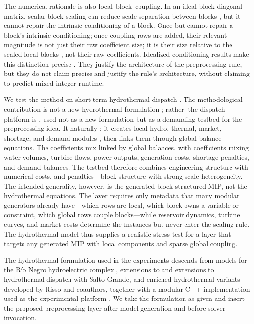 \documentclass[AMA,Times1COL]{WileyNJDv5} %
\providecommand{\DIFadd}[1]{{\protect\color{blue} \sf #1}} %
\providecommand{\DIFdel}[1]{{\protect\color{red} \scriptsize #1}} %
\providecommand{\DIFaddbegin}{} %
\providecommand{\DIFaddend}{} %
\providecommand{\DIFdelbegin}{} %
\providecommand{\DIFdelend}{} %
\begin{document}
\DIFadd{The }\DIFaddend numerical rationale is also local--block--coupling. In an ideal block-diagonal matrix,
scalar block scaling can reduce scale separation between blocks \DIFdelbegin \DIFdel{, but it cannot repair the
intrinsic conditioning of a block. Once }\DIFdelend \DIFaddbegin \DIFadd{but cannot repair a block's
intrinsic conditioning; once }\DIFaddend coupling rows are added, their relevant magnitude is \DIFdelbegin \DIFdel{not just their raw coefficient size; it is }\DIFdelend their size
relative to the scaled local blocks\DIFaddbegin \DIFadd{, not their raw coefficients}\DIFaddend . Idealized conditioning
results make this \DIFdelbegin \DIFdel{distinction precise . They justify the architecture of the preprocessing rule, but they do not claim }\DIFdelend \DIFaddbegin \DIFadd{precise and justify the rule's architecture, without claiming }\DIFaddend to predict
mixed-integer runtime.

We test the method on short-term hydrothermal dispatch\DIFdelbegin \DIFdel{. The methodological contribution is not a new hydrothermal formulation ; rather, the dispatch platform is }\DIFdelend \DIFaddbegin \DIFadd{, used not as a new formulation but as }\DIFaddend a
demanding testbed\DIFdelbegin \DIFdel{for the preprocessing idea. It naturally }\DIFdelend \DIFaddbegin \DIFadd{: it }\DIFaddend creates local hydro, thermal, market, shortage, and demand modules \DIFdelbegin \DIFdel{, then links them through global balance equations. The coefficients mix }\DIFdelend \DIFaddbegin \DIFadd{linked
by global balances, with coefficients mixing }\DIFaddend water volumes, turbine flows, power outputs, \DIFdelbegin \DIFdel{generation costs,
shortage penalties, and demand balances. The testbed therefore combines engineering structure with numerical }\DIFdelend \DIFaddbegin \DIFadd{costs,
and penalties---block structure with strong }\DIFaddend scale heterogeneity. \DIFaddbegin \DIFadd{The intended generality,
however, is the generated block-structured MIP, not the hydrothermal equations. The layer
requires only metadata that many modular generators already have---which rows are local, which
block owns a variable or constraint, which global rows couple blocks---while reservoir dynamics,
turbine curves, and market costs determine the instances but never enter the scaling rule. The
hydrothermal model thus supplies a realistic stress test for a layer that targets any generated
MIP with local components and sparse global coupling.
}\DIFaddend 

The hydrothermal formulation used in the experiments descends from models for the
R\'io Negro hydroelectric complex \DIFdelbegin \DIFdel{, extensions to }\DIFdelend \DIFaddbegin \DIFadd{and extensions to hydrothermal dispatch with }\DIFaddend Salto
Grande, \DIFdelbegin \DIFdel{and enriched hydrothermal
variants }\DIFdelend developed by Risso and coauthors, together with a modular C++ implementation
used as the experimental platform
\DIFdelbegin \DIFdel{\citep{risso2025rioNegro,risso2025uruguayRiver,risso2026enriched,rodriguez2025thesis}}\DIFdelend \DIFaddbegin \DIFadd{\cite{risso2025rioNegro,risso2025uruguayRiver,rodriguez2025thesis}}\DIFaddend .
We take the formulation as given and insert the proposed preprocessing layer after model
generation and before solver invocation.
\end{document}
